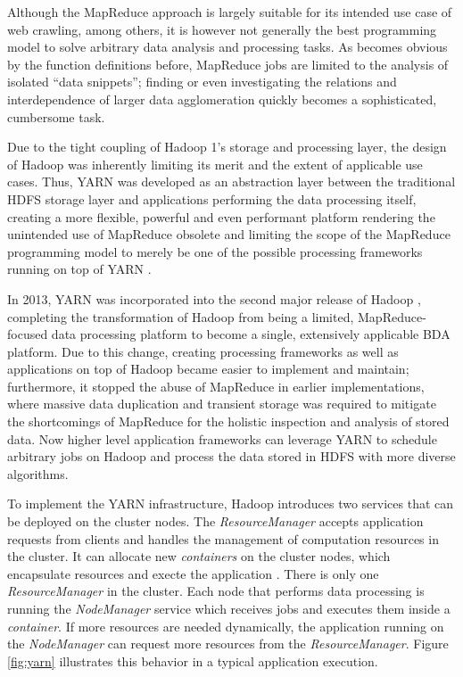 Although the MapReduce approach is largely suitable for its intended use case of web crawling, among others, it is however not generally the best programming model to solve arbitrary data analysis and processing tasks.
As becomes obvious by the function definitions before, MapReduce jobs are limited to the analysis of isolated \enquote{data snippets}; finding or even investigating the relations and interdependence of larger data agglomeration quickly becomes a sophisticated, cumbersome task.

Due to the tight coupling of Hadoop 1's storage and processing layer, the design of Hadoop was inherently limiting its merit and the extent of applicable use cases. Thus, \ac{YARN} was developed as an abstraction layer between the traditional \ac{HDFS} storage layer and applications performing the data processing itself, creating a more flexible, powerful and even performant platform rendering the unintended use of MapReduce obsolete and limiting the scope of the MapReduce programming model to merely be one of the possible processing frameworks running on top of \ac{YARN} \autocite[p.~6]{vavilapalli2013apache}.

In 2013, \ac{YARN} was incorporated into the second major release of Hadoop \autocite{hadoopreleasenotes}, completing the transformation of Hadoop from being a limited, MapReduce-focused data processing platform to become a single, extensively applicable \ac{BDA} platform. Due to this change, creating processing frameworks as well as applications on top of Hadoop became easier to implement and maintain; furthermore, it stopped the abuse of MapReduce in earlier implementations, where massive data duplication and transient storage was required to mitigate the shortcomings of MapReduce for the holistic inspection and analysis of stored data.
Now higher level application frameworks can leverage \ac{YARN} to schedule arbitrary jobs on Hadoop and process the data stored in \ac{HDFS} with more diverse algorithms.

To implement the \ac{YARN} infrastructure, Hadoop introduces two services that can be deployed on the cluster nodes.
The \emph{ResourceManager} accepts application requests from clients and handles the management of computation resources in the cluster.
It can allocate new \emph{containers} on the cluster nodes, which encapsulate resources and execte the application .
There is only one \emph{ResourceManager} in the cluster.
Each node that performs data processing is running the \emph{NodeManager} service which receives jobs and executes them inside a \emph{container}.
If more resources are needed dynamically, the application running on the \emph{NodeManager} can request more resources from the \emph{ResourceManager}.
Figure \ref{fig:yarn} illustrates this behavior in a typical application execution.

